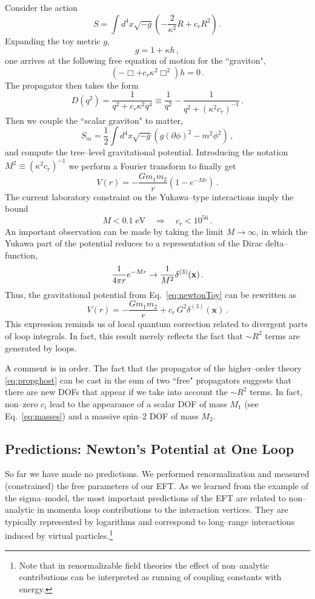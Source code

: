 \documentclass[11pt,a4paper]{article}
\newcommand{\be}{\begin{equation}}
\newcommand{\ee}{\end{equation}}
\def\d{\partial}
\begin{document}
Consider the action
\be
S=\int d^4x \sqrt{-g}\left(
-\frac{2}{\kappa^2}R+c_r R^2
\right)\,.
\ee
Expanding the toy metric $g$,
\be
g=1+\kappa h\,,
\ee
one arrives at the following free equation of motion for the ``graviton",
\be
(-\Box+c_r\kappa^2 \Box^2)h=0\,.
\ee
The propagator then takes the form
\be
\label{eq:propghost}
D(q^2)= \frac{1}{q^2+c_r\kappa^2 q^4}\equiv \frac{1}{q^2}-\frac{1}{q^2+(\kappa^2 c_r)^{-1}}\,.
\ee
Then we couple the ``scalar graviton" to matter,
\be
S_m=\frac{1}{2}\int d^4x \sqrt{-g}\left(
g(\d\phi)^2-m^2\phi^2
\right)\,,
\ee
and compute the tree--level gravitational potential.
Introducing the notation $M^2\equiv (\kappa^2 c_r)^{-1}$ we perform a Fourier transform to finally get
\be
\label{eq:newtonToy}
V(r)=-\frac{G m_1 m_2}{r}(1-e^{-Mr})\,.
\ee
The current laboratory constraint on the Yukawa--type interactions imply the bound
\be
M < 0.1 \;\text{eV} \quad \Rightarrow \quad c_r< 10^{56}\,.
\ee
An important observation can be made by taking the limit $M\to \infty$,
in which the Yukawa part of the potential reduces to a representation of the Dirac delta--function,
\be
\frac{1}{4\pi r} e^{-M r} \to \frac{1}{M^2}\delta^{(3)}({\bf x})\,.
\ee
Thus, the gravitational potential from Eq.~\eqref{eq:newtonToy} can be rewritten as
\be
 V(r)=-\frac{G m_1 m_2}{r}+c_r\, G^2\delta^{(3)}(\textbf{x})\,.
\ee
This expression reminds us of local quantum correction related to divergent parts of loop integrals.
In fact, this result merely reflects the fact that $\sim R^2$ terms are generated by loops.

A comment is in order. The fact that the propagator of the higher--order theory \eqref{eq:propghost}
can be cast in the sum of two ``free" propagators suggests that there are new DOFs that appear if we take into account the $\sim R^2$ terms.
In fact, non--zero $c_i$ lead to the appearance of a scalar DOF of mass
$M_1$ (see Eq.~\eqref{eq:masses}) and a massive spin--2 DOF of mass $M_2$.

\subsection{Predictions: Newton's Potential at One Loop}

So far we have made no predictions.
We performed renormalization and measured (constrained) the free parameters of our EFT.
As we learned from the example of the sigma--model, the most important predictions of the EFT
are related to non--analytic in momenta loop contributions to the interaction vertices.
They are typically represented by logarithms and correspond to long--range interactions induced by
virtual particles.\footnote{
Note that in renormalizable field theories
the effect of non--analytic
contributions can be interpreted as running of coupling constants with energy.
}
\end{document}
